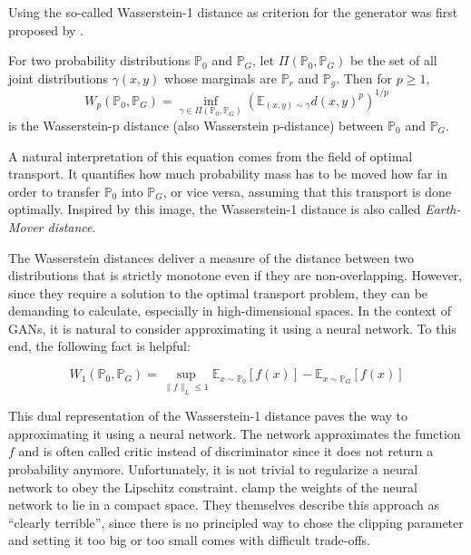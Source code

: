 Using the so-called Wasserstein-1 distance as criterion for the generator was first proposed by \Textcite{arjovsky2017wassersteingan}.%

\begin{definition}
    For two probability distributions $\mathbb{P}_0$ and $\mathbb{P}_G$, let $\Pi (\mathbb{P}_0, \mathbb{P}_G)$ be the set of all joint distributions $\gamma(x, y)$ whose marginals are $\mathbb{P}_r$ and $\mathbb{P}_g$.
    Then for $p \geq 1$,%
    $$
    W_p(\mathbb{P}_0, \mathbb{P}_G) = \inf_{\gamma \in \Pi(\mathbb{P}_0, \mathbb{P}_G)} \left(\mathbb{E}_{(x, y) \sim \gamma} d(x, y)^p \right)^{1/p}
    $$
    is the Wasserstein-p distance (also Wasserstein p-distance) between $\mathbb{P}_0$ and $\mathbb{P}_G$.
\end{definition}

A natural interpretation of this equation comes from the field of optimal transport.
It quantifies how much probability mass has to be moved how far in order to transfer $\mathbb{P}_0$ into $\mathbb{P}_G$, or vice versa, assuming that this transport is done optimally.
Inspired by this image, the Wasserstein-1 distance is also called \textit{Earth-Mover distance}.

The Wasserstein distances deliver a measure of the distance between two distributions that is strictly monotone even if they are non-overlapping. %
However, since they require a solution to the optimal transport problem, they can be demanding to calculate, especially in high-dimensional spaces. %
In the context of GANs, it is natural to consider approximating it using a neural network.
To this end, the following fact is helpful:

\begin{theorem}
    \begin{equation}
        W_{1}\left(\mathbb{P}_0, \mathbb{P}_G\right)=\sup _{\|f\|_L \leq 1} \mathbb{E}_{x \sim \mathbb{P}_0}[f(x)]-\mathbb{E}_{x \sim \mathbb{P}_G}[f(x)]
    \end{equation}
\end{theorem}

This dual representation of the Wasserstein-1 distance paves the way to approximating it using a neural network.
The network approximates the function $f$ and is often called critic instead of discriminator since it does not return a probability anymore.
Unfortunately, it is not trivial to regularize a neural network to obey the Lipschitz constraint.
\Textcite{arjovsky2017wassersteingan} clamp the weights of the neural network to lie in a compact space.
They themselves describe this approach as ``clearly terrible'', since there is no principled way to chose the clipping parameter and setting it too big or too small comes with difficult trade-offs. %

